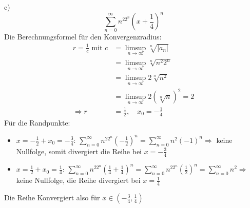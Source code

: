 \documentclass[a4paper]{article}
\begin{document}
\newpage
\setlength{\headheight}{0cm}
\par{c)}
\[
	\sum_{n=0}^\infty n^22^n \left(x + \frac 1 4\right)^n
	\]
Die Berechnungsformel für den Konvergenzradius:
\begin{align*}
	r = \frac 1 c \text{ mit }
	c &= \limsup_{n\rightarrow\infty} \sqrt[n]{\vert a_n \vert} \\
	&= \limsup_{n\rightarrow\infty} \sqrt[n]{n^2 2^n} \\
	&= \limsup_{n\rightarrow\infty} 2 \sqrt[n]{n^2} \\
	&= \limsup_{n\rightarrow\infty} 2
	\left( \sqrt[n]{n} \right)^2 = 2 \\
	\Rightarrow
	r &= \frac 1 2, \quad x_0 = -\frac14
\end{align*}
Für die Randpunkte:
\begin{itemize}
	\item $x = -\frac12 + x_0 = -\frac34$: $\sum_{n=0}^\infty n^22^n 
		\left( -\frac12 \right)^n = 
		\sum_{n=0}^\infty n^2 (-1)^n
		\Rightarrow
		$
		keine Nullfolge, somit divergiert die Reihe bei 
		$x = -\frac34$
	\item $x = \frac12 + x_0 = \frac14$: $\sum_{n=0}^\infty n^22^n
		\left( \frac14 + \frac14 \right)^n
		=
		\sum_{n=0}^\infty n^22^n \left( \frac12 \right)^n
		=
		\sum_{n=0}^\infty n^2
		\Rightarrow
		$
		keine Nullfolge, die Reihe divergiert bei 
		$x = \frac14$
\end{itemize}
Die Reihe Konvergiert also für $x \in \left(-\frac34, \frac14\right)$

\vspace{0.5cm}
\setlength{\headheight}{0cm} 
\end{document}
